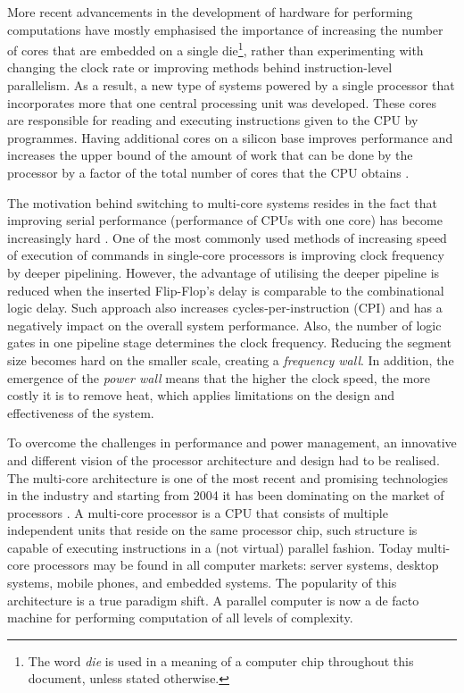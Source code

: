 More recent advancements in the development of hardware for performing computations have mostly emphasised the importance of increasing the number of cores that are embedded on a single die\footnote{The word \textit{die} is used in a meaning of a computer chip throughout this document, unless stated otherwise.}, rather than experimenting with changing the clock rate or improving methods behind instruction-level parallelism. As a result, a new type of systems powered by a single processor that incorporates more that one central processing unit was developed. These cores are responsible for reading and executing instructions given to the CPU by programmes. Having additional cores on a silicon base improves performance and increases the upper bound of the amount of work that can be done by the processor by a factor of the total number of cores that the CPU obtains \cite{gove2010multicore}.

The motivation behind switching to multi-core systems resides in the fact that improving serial performance (performance of CPUs with one core) has become increasingly hard \cite{Jagtap2009}. One of the most commonly used methods of increasing speed of execution of commands in single-core processors is improving clock frequency by deeper pipelining. However, the advantage of utilising the deeper pipeline is reduced when the inserted Flip-Flop’s delay is comparable to the combinational logic delay. Such approach also increases cycles-per-instruction (CPI) and has a negatively impact on the overall system performance. Also, the number of logic gates in one pipeline stage determines the clock frequency. Reducing the segment size becomes hard on the smaller scale, creating a \textit{frequency wall}. In addition, the emergence of the \textit{power wall} means that the higher the clock speed, the more costly it is to remove heat, which applies limitations on the design and effectiveness of the system. 

To overcome the challenges in performance and power management, an innovative and different vision of the processor architecture and design had to be realised. The multi-core architecture is one of the most recent and promising technologies in the industry and starting from 2004 it has been dominating on the market of processors \cite{AMD2005,schauer2008multicore,Gepner2006}. A multi-core processor is a CPU that consists of multiple independent units that reside on the same processor chip, such structure is capable of executing instructions in a (not virtual) parallel fashion. Today multi-core processors may be found in all computer markets: server systems, desktop systems, mobile phones, and embedded systems. The popularity of this architecture is a true paradigm shift. A parallel computer is now a de facto machine for performing computation of all levels of complexity. \cite{Jagtap2009}


